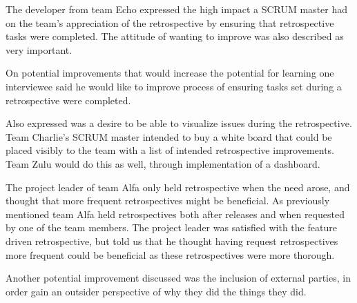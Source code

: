 The developer from team Echo expressed the high impact a SCRUM master had on the team's appreciation of the retrospective by ensuring that retrospective tasks were completed. The attitude of wanting to improve was also described as very important.

\label{question-18}
On potential improvements that would increase the potential for learning one interviewee said he would like to improve process of ensuring tasks set during a retrospective were completed. 

Also expressed was a desire to be able to visualize issues during the retrospective. Team Charlie's SCRUM master intended to buy a white board that could be placed visibly to the team with a list of intended retrospective improvements. Team Zulu would do this as well, through implementation of a dashboard. 

The project leader of team Alfa only held retrospective when the need arose, and thought that more frequent retrospectives might be beneficial. As previously mentioned team Alfa held retrospectives both after releases and when requested by one of the team members. The project leader was satisfied with the feature driven retrospective, but told us that he thought having request retrospectives more frequent could be beneficial as these retrospectives were more thorough. 

Another potential improvement discussed was the inclusion of external parties, in order gain an outsider perspective of why they did the things they did. 
